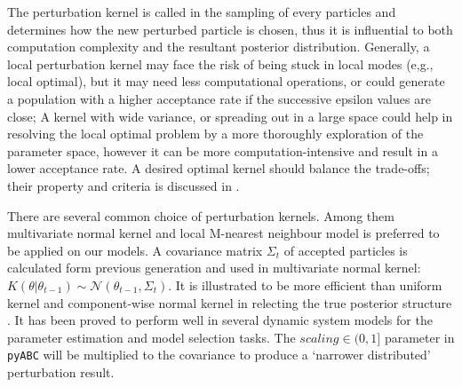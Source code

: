 


The perturbation kernel is called in the sampling of every particles and determines how the new perturbed particle is chosen, thus it is influential to both computation complexity and the resultant posterior distribution. Generally, a local perturbation kernel may face the risk of being stuck in local modes (e,g., local optimal), but it may need less computational operations, or could generate a population with a higher acceptance rate if the successive epsilon values are close; A kernel with wide variance, or spreading out in a large space could help in resolving the local optimal problem by a more thoroughly exploration of the parameter space, however it can be more computation-intensive and result in a lower acceptance rate. A desired optimal kernel should balance the trade-offs; their property and criteria is discussed in \cite{ref:kernel}.

There are several common choice of perturbation kernels. Among them multivariate normal kernel and local M-nearest neighbour model is preferred to be applied on our models. A covariance matrix $\Sigma_t$ of accepted particles is calculated form previous generation and used in multivariate normal kernel: $K(\theta|\theta_{t-1})\sim\mathcal{N}(\theta_{t-1}, \Sigma_t)$. It is illustrated to be more efficient than uniform kernel and component-wise normal kernel in relecting the true posterior structure \cite{ref:kernel}. It has been proved to perform well in several dynamic system models \cite{ref:abcsysbio, ref:compare, ref:disease} for the parameter estimation and model selection tasks. The $scaling\in(0,1]$ parameter in \verb|pyABC| will be multiplied to the covariance to produce a `narrower distributed' perturbation result.

